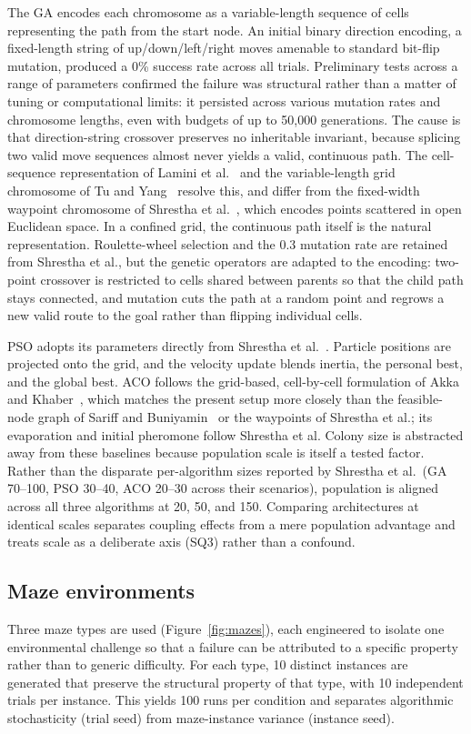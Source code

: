\documentclass[11pt,a4paper]{article}
\begin{document}
    The GA encodes each chromosome as a variable-length sequence of cells representing the path from the start node. An initial binary direction encoding, a fixed-length string of up/down/left/right moves amenable to standard bit-flip mutation, produced a 0\% success rate across all trials. Preliminary tests across a range of parameters confirmed the failure was structural rather than a matter of tuning or computational limits: it persisted across various mutation rates and chromosome lengths, even with budgets of up to 50{,}000 generations. The cause is that direction-string crossover preserves no inheritable invariant, because splicing two valid move sequences almost never yields a valid, continuous path. The cell-sequence representation of Lamini et al.~\cite{benhlima2018} and the variable-length grid chromosome of Tu and Yang~\cite{tu2003} resolve this, and differ from the fixed-width waypoint chromosome of Shrestha et al.~\cite{shrestha2024}, which encodes points scattered in open Euclidean space. In a confined grid, the continuous path itself is the natural representation. Roulette-wheel selection and the 0.3 mutation rate are retained from Shrestha et al., but the genetic operators are adapted to the encoding: two-point crossover is restricted to cells shared between parents so that the child path stays connected, and mutation cuts the path at a random point and regrows a new valid route to the goal rather than flipping individual cells.

    PSO adopts its parameters directly from Shrestha et al.~\cite{shrestha2024}. Particle positions are projected onto the grid, and the velocity update blends inertia, the personal best, and the global best. ACO follows the grid-based, cell-by-cell formulation of Akka and Khaber~\cite{akka2018}, which matches the present setup more closely than the feasible-node graph of Sariff and Buniyamin~\cite{sariff2009} or the waypoints of Shrestha et al.; its evaporation and initial pheromone follow Shrestha et al. Colony size is abstracted away from these baselines because population scale is itself a tested factor. Rather than the disparate per-algorithm sizes reported by Shrestha et al.\ (GA 70--100, PSO 30--40, ACO 20--30 across their scenarios), population is aligned across all three algorithms at 20, 50, and 150. Comparing architectures at identical scales separates coupling effects from a mere population advantage and treats scale as a deliberate axis (SQ3) rather than a confound.

    \subsection{Maze environments} \label{environments}
    Three maze types are used (Figure~\ref{fig:mazes}), each engineered to isolate one environmental challenge so that a failure can be attributed to a specific property rather than to generic difficulty. For each type, 10 distinct instances are generated that preserve the structural property of that type, with 10 independent trials per instance. This yields 100 runs per condition and separates algorithmic stochasticity (trial seed) from maze-instance variance (instance seed).
\end{document}
